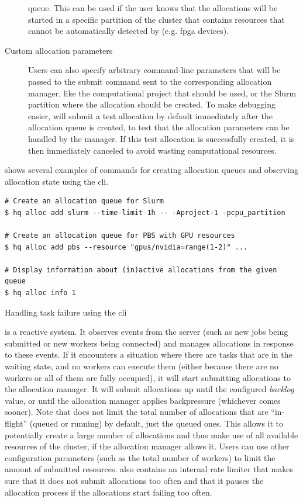 \begin{description}
		queue. This can be used if the user knows that the allocations will be started in a specific
		partition of the cluster that contains resources that cannot be automatically detected by
		\hyperqueue{} (e.g. \gls{fpga} devices).
	\item[Custom allocation parameters] Users can also specify arbitrary command-line parameters that will be passed to the submit command
		sent to the corresponding allocation manager, like the computational project that should be used,
		or the Slurm partition where the allocation should be created. To make debugging easier,
		\hyperqueue{} will submit a test allocation by default immediately after the allocation
		queue is created, to test that the allocation parameters can be handled by the manager. If this
		test allocation is successfully created, it is then immediately canceled to avoid wasting
		computational resources.
\end{description}

 shows several examples of commands for creating allocation queues and
observing allocation state using the \hyperqueue{} \gls{cli}.

\begin{listing}[h]
	\begin{verbatim}
# Create an allocation queue for Slurm
$ hq alloc add slurm --time-limit 1h -- -Aproject-1 -pcpu_partition

# Create an allocation queue for PBS with GPU resources
$ hq alloc add pbs --resource "gpus/nvidia=range(1-2)" ...

# Display information about (in)active allocations from the given queue
$ hq alloc info 1
	\end{verbatim}
	\caption{Handling task failure using the \hyperqueue{} \gls{cli}}
	\label{lst:hq-cli-autoalloc}
\end{listing}

\Autoalloc{} is a reactive system. It observes events from the server (such as new jobs
being submitted or new workers being connected) and manages allocations in response to these
events. If it encounters a situation where there are tasks that are in the waiting state, and no
workers can execute them (either because there are no workers or all of them are fully occupied),
it will start submitting allocations to the allocation manager. It will submit allocations up until
the configured \emph{backlog} value, or until the allocation manager applies backpressure
(whichever comes sooner). Note that \autoalloc{} does not limit the total number of
allocations that are ``in-flight'' (queued or running) by default, just the queued ones. This
allows it to potentially create a large number of allocations and thus make use of all available
resources of the cluster, if the allocation manager allows it. Users can use other configuration
parameters (such as the total number of workers) to limit the amount of submitted resources.
\Autoalloc{} also contains an internal rate limiter that makes sure that it does not
submit allocations too often and that it pauses the allocation process if the allocations start
failing too often.

